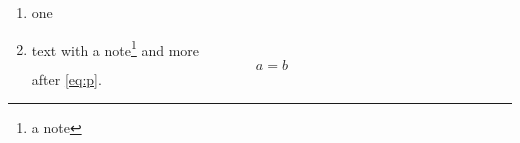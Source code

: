 \documentclass{article}
\begin{document}
\begin{enumerate}
\item one
\item[] text with a note\footnote{a note} and more
\begin{equation}\label{eq:p} a=b \end{equation}
after \ref{eq:p}.
\end{enumerate}
\end{document}
